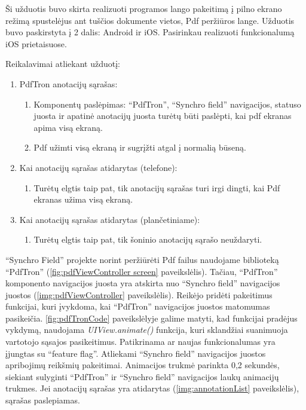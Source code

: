 Ši užduotis buvo skirta realizuoti programos lango pakeitimą į pilno ekrano režimą spustelėjus ant tuščios dokumente vietos, Pdf peržiūros lange. Užduotis buvo paskirstyta į 2 dalis: Android ir iOS. Pasirinkau realizuoti funkcionalumą iOS prietaisuose.

Reikalavimai atliekant užduotį:

\begin{enumerate}
    \item PdfTron anotacijų sąrašas:
    \begin{enumerate}
        \item Komponentų paslėpimas: \enquote{PdfTron}, \enquote{Synchro field} navigacijos, statuso juosta ir apatinė anotacijų juosta turėtų būti paslėpti, kai pdf ekranas apima visą ekraną.
        \item Pdf užimti visą ekraną ir sugrįžti atgal į normalią būseną.
    \end{enumerate}
    \item Kai anotacijų sąrašas atidarytas (telefone):
    \begin{enumerate}
        \item Turėtų elgtis taip pat, tik anotacijų sąrašas turi irgi dingti, kai Pdf ekranas užima visą ekraną.
    \end{enumerate}
    \item Kai anotacijų sąrašas atidarytas (plančetiniame):
    \begin{enumerate}
        \item Turėtų elgtis taip pat, tik šoninio anotacijų sąrašo neuždaryti.
    \end{enumerate}
\end{enumerate}


\enquote{Synchro Field} projekte norint peržiūrėti Pdf failus naudojame biblioteką \enquote{PdfTron} (\ref{fig:pdfViewController screen} paveikslėlis). Tačiau, \enquote{PdfTron} komponento navigacijos juosta yra atskirta nuo \enquote{Synchro field} navigacijos juostos (\ref{img:pdfViewController} paveikslėlis). Reikėjo pridėti pakeitimus funkcijai, kuri įvykdoma, kai \enquote{PdfTron} navigacijos juostos matomumas pasikeičia. \ref{fig:pdfTronCode} paveikslėlyje galime matyti, kad funkcijai pradėjus vykdymą, naudojama \textit{UIView.animate()} funkcija, kuri sklandžiai suanimuoja vartotojo sąsajos pasikeitimus. Patikrinama ar naujas funkcionalumas yra įjungtas su \enquote{feature flag}. Atliekami \enquote{Synchro field} navigacijos juostos apribojimų reikšmių pakeitimai. Animacijos trukmė parinkta 0,2 sekundės, siekiant sulyginti \enquote{PdfTron} ir \enquote{Synchro field} navigacijos laukų animacijų trukmes. Jei anotacijų sąrašas yra atidarytas (\ref{img:annotationList} paveikslėlis), sąrašas paslepiamas.

